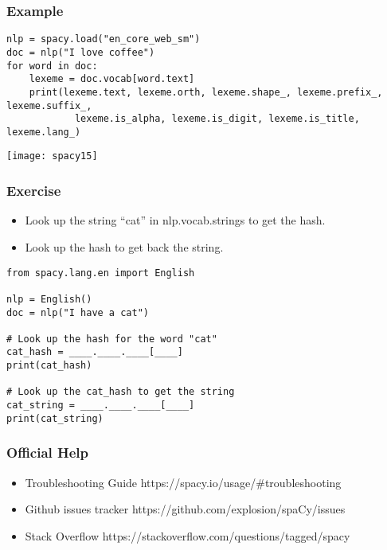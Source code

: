 \begin{frame}[fragile]\frametitle{Example}

\begin{lstlisting}
nlp = spacy.load("en_core_web_sm")
doc = nlp("I love coffee")
for word in doc:
    lexeme = doc.vocab[word.text]
    print(lexeme.text, lexeme.orth, lexeme.shape_, lexeme.prefix_, lexeme.suffix_,
            lexeme.is_alpha, lexeme.is_digit, lexeme.is_title, lexeme.lang_)
\end{lstlisting}

	\begin{center}
\texttt{[image: spacy15]}
\end{center}


\end{frame}

\begin{frame}[fragile]\frametitle{Exercise}

  \begin{itemize}
    \item Look up the string “cat” in nlp.vocab.strings to get the hash.
    \item Look up the hash to get back the string.
  \end{itemize}
	
	
\begin{lstlisting}
from spacy.lang.en import English

nlp = English()
doc = nlp("I have a cat")

# Look up the hash for the word "cat"
cat_hash = ____.____.____[____]
print(cat_hash)

# Look up the cat_hash to get the string
cat_string = ____.____.____[____]
print(cat_string)
\end{lstlisting}




\end{frame}

\begin{frame}[fragile]\frametitle{Official Help}
  \begin{itemize}
    \item Troubleshooting Guide https://spacy.io/usage/\#troubleshooting
		\item Github issues tracker https://github.com/explosion/spaCy/issues
		\item Stack Overflow  https://stackoverflow.com/questions/tagged/spacy
  \end{itemize}
	
	
\end{frame}